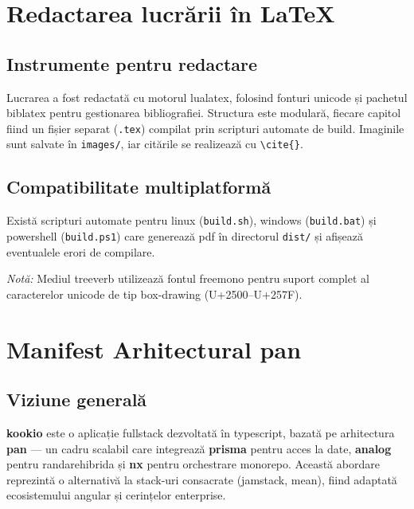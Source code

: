 \section{Redactarea lucrării în \LaTeX}\label{ch:appendix-latex}

\subsection{Instrumente pentru redactare}
Lucrarea a fost redactată cu motorul \gls{lualatex}, folosind fonturi \gls{unicode} și pachetul \gls{biblatex} pentru gestionarea bibliografiei. Structura este modulară, fiecare capitol fiind un fișier separat (\texttt{.tex}) compilat prin scripturi automate de \gls{build}.
Imaginile sunt salvate în \texttt{images/}, iar citările se realizează cu \verb|\cite{}|.

\subsection{Compatibilitate multiplatformă}
Există scripturi automate pentru \gls{linux} (\texttt{build.sh}), \gls{windows} (\texttt{build.bat}) și \gls{powershell} (\texttt{build.ps1}) care generează \acrfull{pdf} în directorul \texttt{dist/} și afișează eventualele erori de compilare.

\vspace{0.5em}
\noindent\textit{Notă:} Mediul \gls{treeverb} utilizează fontul \gls{freemono} pentru suport complet al caracterelor \gls{unicode} de tip box-drawing (U+2500–U+257F).

\nocite{vite,cockroachdb,redis,firebase_auth,json_schema}

\section{\texorpdfstring{Manifest Arhitectural \acrfull{pan}}{Manifest Arhitectural PAN}}\label{ch:appendix-manifest}

\subsection{Viziune generală}
\textbf{\gls{kookio}} este o aplicație \gls{fullstack} dezvoltată în \gls{typescript}, bazată pe arhitectura
\textbf{\gls{pan}} — un cadru scalabil care integrează \textbf{\gls{prisma}} pentru acces la date,
\textbf{\gls{analog}} pentru \gls{randarehibrida} și \textbf{\gls{nx}} pentru orchestrare \gls{monorepo}.
Această abordare reprezintă o alternativă la stack-uri consacrate (\gls{jamstack}, \gls{mean}),
fiind adaptată ecosistemului \gls{angular} și cerințelor enterprise.

